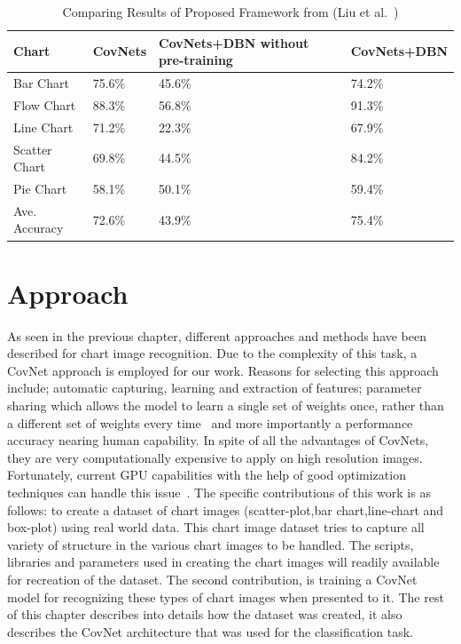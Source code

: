 \documentclass[12pt, a4paper,oneside]{report}
\begin{document}
\begin{table}[h]
	\centering {} \small
	\begin{tabular}{|p{3cm}|p{3cm}|p{3cm}|p{3cm}|}
		
		\hline
		Chart & CovNets&CovNets+DBN without pre-training & CovNets+DBN \\ \hline
				
		Bar Chart & 75.6\% & 45.6\% & 74.2\% \\ \hline
		Flow Chart & 88.3\%  & 56.8\% & 91.3\%  \\ \hline
		Line Chart  & 71.2\%  & 22.3\% & 67.9\% \\ \hline
	
		Scatter Chart & 69.8\% & 44.5\% & 84.2\% \\ \hline
		Pie Chart & 58.1\%  & 50.1\% & 59.4\%    \\ \hline
		Ave. Accuracy & 72.6\%  & 43.9\% & 75.4\% \\ \hline
		
	\end{tabular}
	\caption {Comparing Results of Proposed Framework from (Liu et al.~\cite{liu2015chart}) }	
	\label{table:deep}
	
\end{table}


\chapter{Approach}
As seen in the previous chapter, different approaches and methods have been described for chart image recognition. Due to the complexity of this task, a CovNet approach is employed for our work. Reasons for selecting this approach include; automatic capturing, learning and extraction of features; parameter sharing which allows the model to learn a single set of weights once, rather than a different set of weights every time~\cite{Rodriguez} and more importantly a performance accuracy nearing human capability. In spite of all the advantages of CovNets, they are very computationally expensive to apply on high resolution images. Fortunately, current GPU capabilities with the help of good optimization techniques can handle this issue~\cite{krizhevsky2012imagenet}. \newline\newline
The specific contributions of this work is as follows: to create a dataset of chart images (scatter-plot,bar chart,line-chart and box-plot) using real world data. This chart image dataset tries to capture all variety of structure in the various chart images to be handled. The scripts, libraries and parameters used in creating the  chart images will readily available for recreation of the dataset. The second contribution, is training a CovNet model for recognizing these types of chart images when presented to it.\newline
The rest of this chapter describes into details how the dataset was created, it also describes the CovNet architecture that was used for the classification task.
\end{document}
